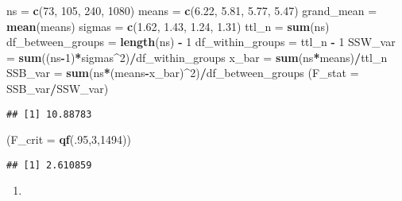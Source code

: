 \documentclass[]{article}
\newenvironment{Shaded}{\begin{snugshade}}{\end{snugshade}}
\newcommand{\KeywordTok}[1]{\textcolor[rgb]{0.13,0.29,0.53}{\textbf{#1}}}
\newcommand{\DataTypeTok}[1]{\textcolor[rgb]{0.13,0.29,0.53}{#1}}
\newcommand{\DecValTok}[1]{\textcolor[rgb]{0.00,0.00,0.81}{#1}}
\newcommand{\FloatTok}[1]{\textcolor[rgb]{0.00,0.00,0.81}{#1}}
\newcommand{\StringTok}[1]{\textcolor[rgb]{0.31,0.60,0.02}{#1}}
\newcommand{\OperatorTok}[1]{\textcolor[rgb]{0.81,0.36,0.00}{\textbf{#1}}}
\newcommand{\NormalTok}[1]{#1}
\begin{document}
\begin{Shaded}
\begin{Highlighting}[]
\NormalTok{ns =}\StringTok{ }\KeywordTok{c}\NormalTok{(}\DecValTok{73}\NormalTok{, }\DecValTok{105}\NormalTok{, }\DecValTok{240}\NormalTok{, }\DecValTok{1080}\NormalTok{)}
\NormalTok{means =}\StringTok{ }\KeywordTok{c}\NormalTok{(}\FloatTok{6.22}\NormalTok{, }\FloatTok{5.81}\NormalTok{, }\FloatTok{5.77}\NormalTok{, }\FloatTok{5.47}\NormalTok{)}
\NormalTok{grand_mean =}\StringTok{ }\KeywordTok{mean}\NormalTok{(means)}
\NormalTok{sigmas =}\StringTok{ }\KeywordTok{c}\NormalTok{(}\FloatTok{1.62}\NormalTok{, }\FloatTok{1.43}\NormalTok{, }\FloatTok{1.24}\NormalTok{, }\FloatTok{1.31}\NormalTok{)}
\NormalTok{ttl_n =}\StringTok{ }\KeywordTok{sum}\NormalTok{(ns)}
\NormalTok{df_between_groups =}\StringTok{ }\KeywordTok{length}\NormalTok{(ns) }\OperatorTok{-}\StringTok{ }\DecValTok{1} 
\NormalTok{df_within_groups =}\StringTok{ }\NormalTok{ttl_n }\OperatorTok{-}\StringTok{ }\DecValTok{1}
\NormalTok{SSW_var =}\StringTok{ }\KeywordTok{sum}\NormalTok{((ns}\OperatorTok{-}\DecValTok{1}\NormalTok{)}\OperatorTok{*}\NormalTok{sigmas}\OperatorTok{^}\DecValTok{2}\NormalTok{)}\OperatorTok{/}\NormalTok{df_within_groups}
\NormalTok{x_bar =}\StringTok{ }\KeywordTok{sum}\NormalTok{(ns}\OperatorTok{*}\NormalTok{means)}\OperatorTok{/}\NormalTok{ttl_n}
\NormalTok{SSB_var =}\StringTok{ }\KeywordTok{sum}\NormalTok{(ns}\OperatorTok{*}\NormalTok{(means}\OperatorTok{-}\NormalTok{x_bar)}\OperatorTok{^}\DecValTok{2}\NormalTok{)}\OperatorTok{/}\NormalTok{df_between_groups}
\NormalTok{(}\DataTypeTok{F_stat =}\NormalTok{ SSB_var}\OperatorTok{/}\NormalTok{SSW_var)}
\end{Highlighting}
\end{Shaded}

\begin{verbatim}
## [1] 10.88783
\end{verbatim}

\begin{Shaded}
\begin{Highlighting}[]
\NormalTok{(}\DataTypeTok{F_crit =} \KeywordTok{qf}\NormalTok{(.}\DecValTok{95}\NormalTok{,}\DecValTok{3}\NormalTok{,}\DecValTok{1494}\NormalTok{))}
\end{Highlighting}
\end{Shaded}

\begin{verbatim}
## [1] 2.610859
\end{verbatim}

\begin{enumerate}
\def\labelenumi{\alph{enumi}.}
\setcounter{enumi}{1}
\item
\end{enumerate}
\end{document}
